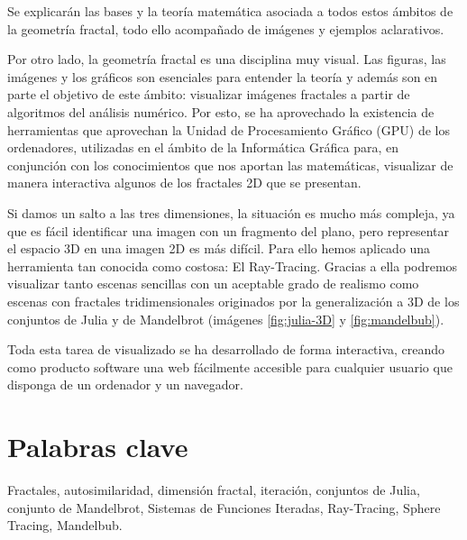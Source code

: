 Se explicarán las bases y la teoría matemática asociada a todos estos ámbitos de la geometría fractal, todo ello acompañado de imágenes y ejemplos aclarativos.

Por otro lado, la geometría fractal es una disciplina muy visual. Las figuras, las imágenes y los gráficos son esenciales para entender la teoría y además son en parte el objetivo de este ámbito: visualizar imágenes fractales a partir de algoritmos del análisis numérico. Por esto, se ha aprovechado la existencia de herramientas que aprovechan la Unidad de Procesamiento Gráfico (GPU) de los ordenadores, utilizadas en el ámbito de la Informática Gráfica para, en conjunción con los conocimientos que nos aportan las matemáticas, visualizar de manera interactiva algunos de los fractales 2D que se presentan. 

Si damos un salto a las tres dimensiones, la situación es mucho más compleja, ya que es fácil identificar una imagen con un fragmento del plano, pero representar el espacio 3D en una imagen 2D es más difícil. Para ello hemos aplicado una herramienta tan conocida como costosa: El Ray-Tracing. Gracias a ella podremos visualizar tanto escenas sencillas con un aceptable grado de realismo como escenas con fractales tridimensionales originados por la generalización a 3D de los conjuntos de Julia y de Mandelbrot (imágenes \ref{fig:julia-3D} y \ref{fig:mandelbub}).

Toda esta tarea de visualizado se ha desarrollado de forma interactiva, creando como producto software una web fácilmente accesible para cualquier usuario que disponga de un ordenador y un navegador.

\section*{Palabras clave}

Fractales, autosimilaridad, dimensión fractal, iteración, conjuntos de Julia, conjunto de Mandelbrot, Sistemas de Funciones Iteradas, Ray-Tracing, Sphere Tracing, Mandelbub. 